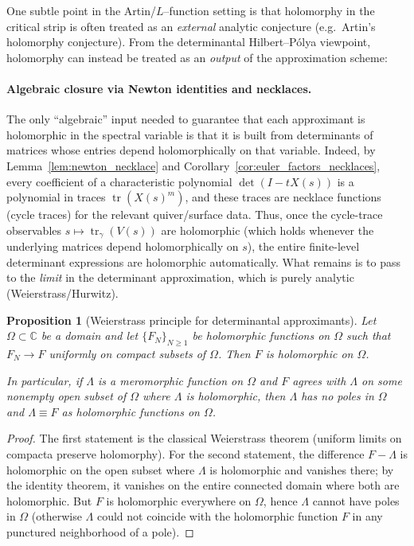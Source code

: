 \documentclass[11pt,oneside]{amsbook}
\numberwithin{equation}{section}
\theoremstyle{plain}
\newtheorem{proposition}[theorem]{Proposition}
\theoremstyle{definition}
\theoremstyle{remark}
\DeclareMathOperator{\tr}{tr}
\newcommand{\C}{\mathbb{C}}
\begin{document}
One subtle point in the Artin/$L$--function setting is that holomorphy in the critical strip is often treated as an \emph{external} analytic conjecture (e.g.\ Artin's holomorphy conjecture).
From the determinantal Hilbert--P\'olya viewpoint, holomorphy can instead be treated as an \emph{output} of the approximation scheme:

\paragraph{Algebraic closure via Newton identities and necklaces.}
The only ``algebraic'' input needed to guarantee that each approximant is holomorphic in the spectral variable is that it is built from determinants of matrices whose entries depend holomorphically on that variable.
Indeed, by Lemma~\ref{lem:newton_necklace} and Corollary~\ref{cor:euler_factors_necklaces}, every coefficient of a characteristic polynomial $\det(I-tX(s))$ is a polynomial in traces $\tr(X(s)^m)$, and these traces are necklace functions (cycle traces) for the relevant quiver/surface data.
Thus, once the cycle-trace observables $s\mapsto \tr_{\gamma}(V(s))$ are holomorphic (which holds whenever the underlying matrices depend holomorphically on $s$), the entire finite-level determinant expressions are holomorphic automatically.
What remains is to pass to the \emph{limit} in the determinant approximation, which is purely analytic (Weierstrass/Hurwitz).



\begin{proposition}[Weierstrass principle for determinantal approximants]
\label{prop:weierstrass_holomorphy_from_approximation}
Let $\Omega\subset\C$ be a domain and let $\{F_N\}_{N\ge 1}$ be holomorphic functions on $\Omega$ such that $F_N\to F$ uniformly on compact subsets of $\Omega$.
Then $F$ is holomorphic on $\Omega$.

In particular, if $\Lambda$ is a meromorphic function on $\Omega$ and $F$ agrees with $\Lambda$ on some nonempty open subset of $\Omega$ where $\Lambda$ is holomorphic, then $\Lambda$ has \emph{no poles} in $\Omega$ and $\Lambda\equiv F$ as holomorphic functions on $\Omega$.
\end{proposition}

\begin{proof}
The first statement is the classical Weierstrass theorem (uniform limits on compacta preserve holomorphy).
For the second statement, the difference $F-\Lambda$ is holomorphic on the open subset where $\Lambda$ is holomorphic and vanishes there; by the identity theorem, it vanishes on the entire connected domain where both are holomorphic.
But $F$ is holomorphic everywhere on $\Omega$, hence $\Lambda$ cannot have poles in $\Omega$ (otherwise $\Lambda$ could not coincide with the holomorphic function $F$ in any punctured neighborhood of a pole).
\end{proof}
\end{document}
